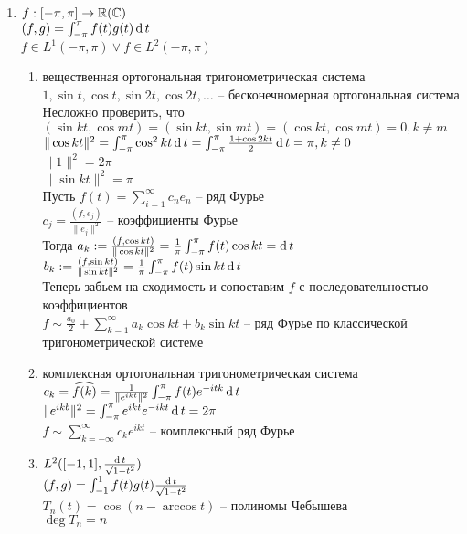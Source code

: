 \documentclass[12pt]{article}
\begin{document}
\begin{enumerate}
    \item $f: [-\pi, \pi] \rightarrow \mathbb{R}(\mathbb{C})$\\
    $(f,g) = \int_{-\pi}^\pi f(t)g(t)\operatorname{d} t$\\
    $f \in L^1(-\pi, \pi) \lor f \in L^2(-\pi, \pi)$
    \begin{enumerate}
        \item вещественная ортогональная тригонометрическая система\\
        $1, \sin t, \cos t, \sin 2t, \cos 2t, \ldots$ -- бесконечномерная ортогональная система\\
        Несложно проверить, что $(\sin kt, \cos mt) = (\sin kt, \sin mt) = (\cos kt, \cos mt) = 0, k \neq m$\\
        $\|\cos kt\|^2 = \int_{-\pi}^\pi \cos^2 kt \operatorname{d} t = \int_{-\pi}^\pi \frac{1+\cos 2kt}2 \operatorname{d} t = \pi, k \neq 0$\\
        $\|1\|^2 = 2\pi$\\
        $\|\sin kt\|^2 = \pi$\\
        Пусть $f(t) = \sum_{i=1}^\infty c_n e_n$ -- ряд Фурье\\
        $c_j = \frac{(f, e_j)}{\|e_j\|^2}$ -- коэффициенты Фурье\\
        Тогда $a_k := \frac{(f, \cos kt)}{\|\cos kt\|^2} = \frac1\pi \int_{-\pi}^\pi f(t)\cos kt = \operatorname{d} t$\\
        $b_k := \frac{(f, \sin kt)}{\|\sin kt\|^2} = \frac1\pi \int_{-\pi}^\pi f(t) \sin kt \operatorname{d} t$\\
        Теперь забьем на сходимость и сопоставим $f$ с последовательностью коэффициентов\\
        $f \sim \frac{a_0}2 + \sum_{k=1}^\infty a_k \cos kt + b_k \sin kt$ -- ряд Фурье по классической тригонометрической системе
        \item комплексная ортогональная тригонометрическая система\\
        $c_k = \widehat{f(k)} = \frac1{\|e^{ikt}\|^2}\int_{-\pi}^{\pi} f(t)e^{-itk}\operatorname{d} t$\\
        $\|e^{ikb}\|^2 = \int_{-\pi}^\pi e^{ikt}e^{-ikt} \operatorname{d} t = 2\pi$\\
        $f \sim \sum_{k=-\infty}^\infty c_k e^{ikt}$ -- комплексный ряд Фурье
        \item $L^2([-1,1], \frac{\operatorname{d} t}{\sqrt{1-t^2}})$\\
        $(f,g) = \int_{-1}^1 f(t)g(t)\frac{\operatorname{d} t}{\sqrt{1-t^2}}$\\
        $T_n(t) = \cos(n-\arccos t)$ -- полиномы Чебышева\\
        $\deg T_n = n$
    \end{enumerate}
\end{enumerate}
\end{document}
